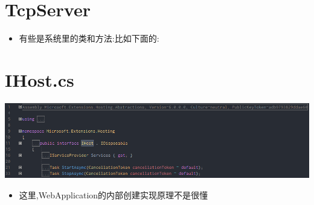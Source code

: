 \documentclass[9pt, b5paper]{article}
\begin{document}
\section{TcpServer}
\label{sec:orge04dd52}
\begin{itemize}
\item 有些是系统里的类和方法:比如下面的:
\end{itemize}
\section{IHost.cs}
\label{sec:org5627214}

\begin{center}
\includegraphics[width=.9\linewidth]{./pic/readme_20230101_222709.png}
\end{center}
\begin{itemize}
\item 这里,WebApplication的内部创建实现原理不是很懂
\end{itemize}
\end{document}
